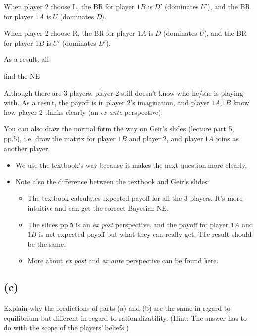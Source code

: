 \documentclass{article}
\begin{document}
When player 2 choose L, the BR for player $1B$ is $D'$ (dominates $U'$), and the BR for player $1A$ is $U$ (dominates $D$).

When player 2 choose R, the BR for player $1A$ is $D$ (dominates $U$), and the BR for player $1B$ is $U'$ (dominates $D'$).

As a result, all 




find the NE


\begin{mdframed}[backgroundcolor=blue!20,linecolor=white]
Although there are 3 players, player 2 still doesn't know who he/she is playing with. As a result, the payoff is in player 2's imagination, and player $1A$,$1B$ know how player 2 thinks clearly (an \textit{ex ante} perspective).

\medskip

You can also draw the normal form the way on Geir's slides (lecture part 5, pp.5), i.e. draw
the matrix for player $1B$ and player $2$, and player $1A$ joins as another player. 

\begin{itemize}
\item We use the textbook's way because it makes the next question more clearly,
\item Note also the difference between the textbook and Geir's slides:
\begin{itemize}

\item The textbook calculates expected payoff for all the 3 players,  It's more intuitive and can get the correct Bayesian NE.

\item The slides pp.5 is an \textit{ex post} perspective, and the payoff for player $1A$ and $1B$ is not expected payoff but what they can really get. The result should be the same.

\item More about \textit{ex post} and \textit{ex ante} perspective can be found \href{https://www.cs.toronto.edu/~cebly/2534/Notes/CSC2534_Lecture9.pdf}{here}.
\end{itemize}

\end{itemize}

\end{mdframed}


\subsection*{(c)} Explain why the predictions of parts (a) and (b) are the same in regard
to equilibrium but different in regard to rationalizability. (Hint: The
answer has to do with the scope of the players' beliefs.)
\end{document}
